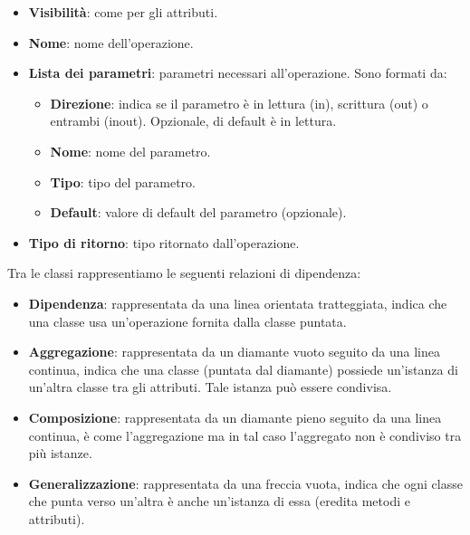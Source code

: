         \begin{itemize}
            \item \textbf{Visibilità}: come per gli attributi.
            \item \textbf{Nome}: nome dell'operazione.
            \item \textbf{Lista dei parametri}: parametri necessari all'operazione. Sono formati da:
            \begin{itemize}
                \item \textbf{Direzione}: indica se il parametro è in lettura (in), scrittura (out) o entrambi (inout). Opzionale, di default è in lettura.
                \item \textbf{Nome}: nome del parametro.
                \item \textbf{Tipo}: tipo del parametro.
                \item \textbf{Default}: valore di default del parametro (opzionale).
            \end{itemize}
            \item \textbf{Tipo di ritorno}: tipo ritornato dall'operazione.
        \end{itemize}
        Tra le classi rappresentiamo le seguenti relazioni di dipendenza:
        \begin{itemize}
            \item \textbf{Dipendenza}: rappresentata da una linea orientata tratteggiata, indica che una classe usa un'operazione fornita dalla classe puntata.
            \item \textbf{Aggregazione}: rappresentata da un diamante vuoto seguito da una linea continua, indica che una classe (puntata dal diamante) possiede un'istanza di un'altra classe tra gli attributi. Tale istanza può essere condivisa.
            \item \textbf{Composizione}: rappresentata da un diamante pieno seguito da una linea continua, è come l'aggregazione ma in tal caso l'aggregato non è condiviso tra più istanze.
            \item \textbf{Generalizzazione}: rappresentata da una freccia vuota, indica che ogni classe che punta verso un'altra è anche un'istanza di essa (eredita metodi e attributi).
        \end{itemize}
